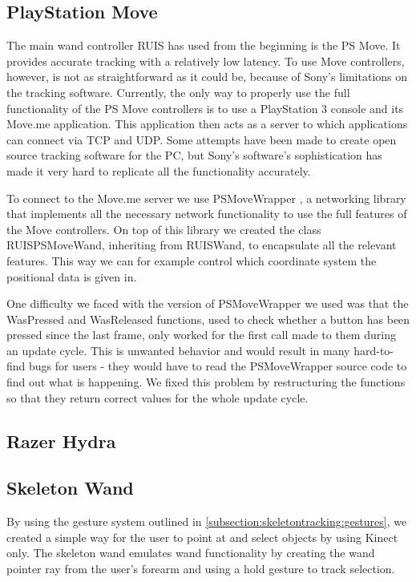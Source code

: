 \documentclass[12pt,a4paper,oneside,pdftex]{report}
\begin{document}
\subsection{PlayStation Move}
\label{subsection:wandcontrollers:psmove}

The main wand controller RUIS has used from the beginning is the PS Move. It provides accurate tracking with a relatively low latency. To use Move controllers, however, is not as straightforward as it could be, because of Sony's limitations on the tracking software. Currently, the only way to properly use the full functionality of the PS Move controllers is to use a PlayStation 3 console and its Move.me application. This application then acts as a server to which applications can connect via TCP and UDP. Some attempts have been made to create open source tracking software for the PC, but Sony's software's sophistication has made it very hard to replicate all the functionality accurately.

To connect to the Move.me server we use PSMoveWrapper \cite{PSMoveWrapper}, a networking library that implements all the necessary network functionality to use the full features of the Move controllers. On top of this library we created the class RUISPSMoveWand, inheriting from RUISWand, to encapsulate all the relevant features. This way we can for example control which coordinate system the positional data is given in.

One difficulty we faced with the version of PSMoveWrapper we used was that the WasPressed and WasReleased functions, used to check whether a button has been pressed since the last frame, only worked for the first call made to them during an update cycle. This is unwanted behavior and would result in many hard-to-find bugs for users - they would have to read the PSMoveWrapper source code to find out what is happening. We fixed this problem by restructuring the functions so that they return correct values for the whole update cycle.

\subsection{Razer Hydra}
\label{subsection:wandcontrollers:hydra}

\subsection{Skeleton Wand}
\label{subsection:wandcontrollers:skeleton}

By using the gesture system outlined in \ref{subsection:skeletontracking:gestures}, we created a simple way for the user to point at and select objects by using Kinect only. The skeleton wand emulates wand functionality by creating the wand pointer ray from the user's forearm and using a hold gesture to track selection. 
\end{document}
